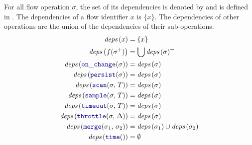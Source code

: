\begin{definition}
    For all flow operation $\sigma$, the set of its dependencies is denoted by \depSet{\sigma} and
    is defined in . The dependencies of a flow identifier $x$ is $\{x\}$.
    The dependencies of other operations are the union of the dependencies of their sub-operations.
    \begin{align}
        \depSet{x}                            & = \{x\} \label{eq:semantics:grfrp:theorems:determinism:deps:ident}                                    \\
        \depSet{f(\sigma^+)}                  & = \bigcup \depSet{\sigma}^+ \label{eq:semantics:grfrp:theorems:determinism:deps:app}                  \\
        \depSet{\onchange{\sigma}}            & = \depSet{\sigma} \label{eq:semantics:grfrp:theorems:determinism:deps:onchange}                       \\
        \depSet{\persist{\sigma}}             & = \depSet{\sigma} \label{eq:semantics:grfrp:theorems:determinism:deps:persist}                        \\
        \depSet{\scan{\sigma}{T}}             & = \depSet{\sigma} \label{eq:semantics:grfrp:theorems:determinism:deps:scan}                           \\
        \depSet{\sample{\sigma}{T}}           & = \depSet{\sigma} \label{eq:semantics:grfrp:theorems:determinism:deps:sample}                         \\
        \depSet{\timeout{\sigma}{T}}          & = \depSet{\sigma} \label{eq:semantics:grfrp:theorems:determinism:deps:timeout}                        \\
        \depSet{\throttle{\sigma}{\Delta}}    & = \depSet{\sigma} \label{eq:semantics:grfrp:theorems:determinism:deps:throttle}                       \\
        \depSet{\mergeop{\sigma_1}{\sigma_2}} & = \depSet{\sigma_1} \cup \depSet{\sigma_2} \label{eq:semantics:grfrp:theorems:determinism:deps:merge} \\
        \depSet{\timeop}                      & = \emptyset \label{eq:semantics:grfrp:theorems:determinism:deps:time}
    \end{align}
\end{definition}

